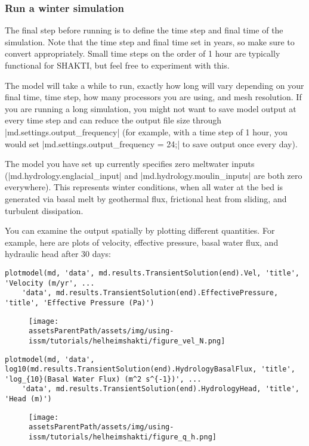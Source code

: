 \subsubsection{Run a winter simulation}
The final step before running is to define the time step and final time of the simulation. Note that the time step and final time set in years, so make sure to convert appropriately. Small time steps on the order of 1 hour are typically functional for SHAKTI, but feel free to experiment with this.

The model will take a while to run, exactly how long will vary depending on your final time, time step, how many processors you are using, and mesh resolution. If you are running a long simulation, you might not want to save model output at every time step and can reduce the output file size through \lstinlinebg|md.settings.output_frequency| (for example, with a time step of 1 hour, you would set \lstinlinebg|md.settings.output_frequency = 24;| to save output once every day).

The model you have set up currently specifies zero meltwater inputs (\lstinlinebg|md.hydrology.englacial_input| and \lstinlinebg|md.hydrology.moulin_inputs| are both zero everywhere). This represents winter conditions, when all water at the bed is generated via basal melt by geothermal flux, frictional heat from sliding, and turbulent dissipation.

You can examine the output spatially by plotting different quantities. For example, here are plots of velocity, effective pressure, basal water flux, and hydraulic head after 30 days:
\begin{lstlisting}
plotmodel(md, 'data', md.results.TransientSolution(end).Vel, 'title', 'Velocity (m/yr', ...
	'data', md.results.TransientSolution(end).EffectivePressure, 'title', 'Effective Pressure (Pa)')
\end{lstlisting}
\begin{figure}[h!]
	\begin{center}
	\texttt{[image: \\assetsParentPath/assets/img/using-issm/tutorials/helheimshakti/figure\_vel\_N.png]}
	\end{center}
\end{figure}

\begin{lstlisting}
plotmodel(md, 'data', log10(md.results.TransientSolution(end).HydrologyBasalFlux, 'title', 'log_{10}(Basal Water Flux) (m^2 s^{-1})', ...
	'data', md.results.TransientSolution(end).HydrologyHead, 'title', 'Head (m)')
\end{lstlisting}
\begin{figure}[h!]
	\begin{center}
	\texttt{[image: \\assetsParentPath/assets/img/using-issm/tutorials/helheimshakti/figure\_q\_h.png]}
	\end{center}
\end{figure}

